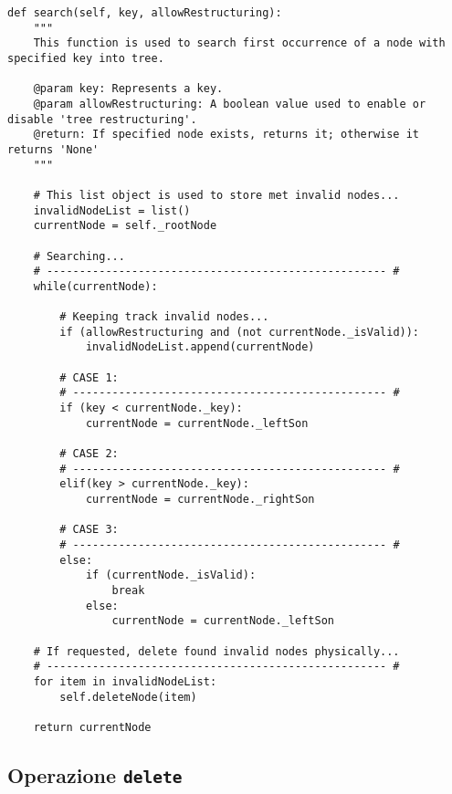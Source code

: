 \documentclass[10pt,a4paper,titlepage]{article}
\begin{document}
\begin{lstlisting}[frame=lines]
def search(self, key, allowRestructuring):
    """
    This function is used to search first occurrence of a node with specified key into tree.
        
    @param key: Represents a key. 
    @param allowRestructuring: A boolean value used to enable or disable 'tree restructuring'.
    @return: If specified node exists, returns it; otherwise it returns 'None'
    """
         
    # This list object is used to store met invalid nodes...
    invalidNodeList = list()
    currentNode = self._rootNode
              
    # Searching...
    # ---------------------------------------------------- #
    while(currentNode):
              
        # Keeping track invalid nodes...
        if (allowRestructuring and (not currentNode._isValid)):
            invalidNodeList.append(currentNode)
              
        # CASE 1:
        # ------------------------------------------------ #
        if (key < currentNode._key):                              
            currentNode = currentNode._leftSon         
            
        # CASE 2:
        # ------------------------------------------------ #
        elif(key > currentNode._key):           
            currentNode = currentNode._rightSon  
              
        # CASE 3:
        # ------------------------------------------------ #
        else:  
            if (currentNode._isValid):       
                break
            else:
                currentNode = currentNode._leftSon
               
    # If requested, delete found invalid nodes physically...
    # ---------------------------------------------------- #
    for item in invalidNodeList:
        self.deleteNode(item)
              
    return currentNode
\end{lstlisting}

\subsection{Operazione \texttt{delete}}
\end{document}
